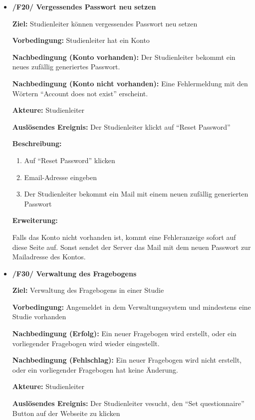 \documentclass[a4paper]{scrreprt}
\begin{document}
\begin{itemize}
                \item \textbf{/F20/ Vergessendes Passwort neu setzen}

                \par \textbf{Ziel: }\gls{Studienleiter} können vergessendes Passwort neu setzen
                \par \textbf{Vorbedingung: }\gls{Studienleiter} hat ein Konto
                \par \textbf{Nachbedingung (Konto vorhanden): }Der \gls{Studienleiter} bekommt ein neues zufällig generiertes Passwort.
                \par \textbf{Nachbedingung (Konto nicht vorhanden): }Eine Fehlermeldung mit den Wörtern ``Account does not exist'' erscheint.
                \par \textbf{Akteure: }\gls{Studienleiter}
                \par \textbf{Auslösendes Ereignis: }Der \gls{Studienleiter} klickt auf ``Reset Password''
                \par \textbf{Beschreibung: }
                \begin{enumerate}
                    \item Auf ``Reset Password'' klicken
                    \item Email-Adresse eingeben
                    \item Der \gls{Studienleiter} bekommt ein Mail mit einem neuen zufällig generierten Passwort
                \end{enumerate}
                \par \textbf{Erweiterung: }
                    \par Falls das Konto nicht vorhanden ist, kommt eine Fehleranzeige sofort auf diese Seite auf. Sonst sendet der Server das Mail mit dem neuen Passwort zur Mailadresse des Kontos.


                \item \textbf{/F30/ Verwaltung des Fragebogens}

                \par \textbf{Ziel: }Verwaltung des Fragebogens in einer Studie
                \par \textbf{Vorbedingung: }Angemeldet in dem Verwaltungssystem und mindestens eine Studie vorhanden
                \par \textbf{Nachbedingung (Erfolg): }Ein neuer Fragebogen wird erstellt, oder ein vorliegender Fragebogen wird wieder eingestellt.
                \par \textbf{Nachbedingung (Fehlschlag): }Ein neuer Fragebogen wird nicht erstellt, oder ein vorliegender Fragebogen hat keine Änderung.
                \par \textbf{Akteure: }\gls{Studienleiter}
                \par \textbf{Auslösendes Ereignis: }Der \gls{Studienleiter} vesucht, den ``Set questionnaire'' Button auf der Webseite zu klicken


\end{itemize}
\end{document}
